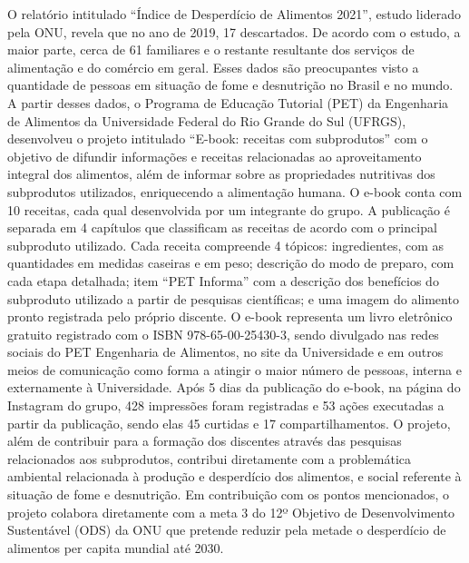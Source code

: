 O relatório intitulado “Índice de Desperdício de Alimentos 2021”, estudo liderado pela
ONU, revela que no ano de 2019, 17%
descartados. De acordo com o estudo, a maior parte, cerca de 61%
familiares e o restante resultante dos serviços de alimentação e do comércio em geral. Esses
dados são preocupantes visto a quantidade de pessoas em situação de fome e desnutrição no
Brasil e no mundo. A partir desses dados, o Programa de Educação Tutorial (PET) da Engenharia
de Alimentos da Universidade Federal do Rio Grande do Sul (UFRGS), desenvolveu o projeto
intitulado “E-book: receitas com subprodutos” com o objetivo de difundir informações e receitas
relacionadas ao aproveitamento integral dos alimentos, além de informar sobre as propriedades
nutritivas dos subprodutos utilizados, enriquecendo a alimentação humana. O e-book conta com
10 receitas, cada qual desenvolvida por um integrante do grupo. A publicação é separada em 4
capítulos que classificam as receitas de acordo com o principal subproduto utilizado. Cada
receita compreende 4 tópicos: ingredientes, com as quantidades em medidas caseiras e em peso;
descrição do modo de preparo, com cada etapa detalhada; item “PET Informa” com a descrição
dos benefícios do subproduto utilizado a partir de pesquisas científicas; e uma imagem do
alimento pronto registrada pelo próprio discente. O e-book representa um livro eletrônico
gratuito registrado com o ISBN 978-65-00-25430-3, sendo divulgado nas redes sociais do PET
Engenharia de Alimentos, no site da Universidade e em outros meios de comunicação como
forma a atingir o maior número de pessoas, interna e externamente à Universidade. Após 5 dias
da publicação do e-book, na página do Instagram do grupo, 428 impressões foram registradas e
53 ações executadas a partir da publicação, sendo elas 45 curtidas e 17 compartilhamentos. O
projeto, além de contribuir para a formação dos discentes através das pesquisas relacionados aos
subprodutos, contribui diretamente com a problemática ambiental relacionada à produção e
desperdício dos alimentos, e social referente à situação de fome e desnutrição. Em contribuição
com os pontos mencionados, o projeto colabora diretamente com a meta 3 do 12º Objetivo de
Desenvolvimento Sustentável (ODS) da ONU que pretende reduzir pela metade o desperdício de
alimentos per capita mundial até 2030.




